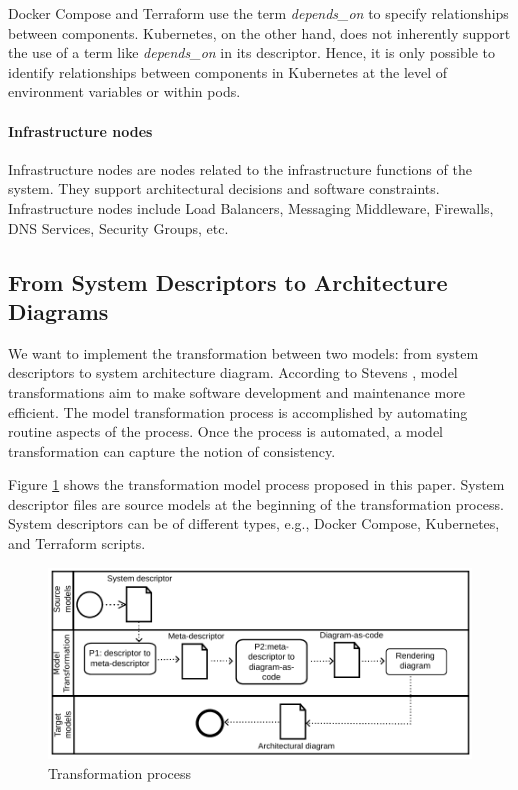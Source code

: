 \documentclass[sigconf]{acmart}
\begin{document}
Docker Compose and Terraform use the term \textit{depends\_on} to specify relationships between components. 
Kubernetes, on the other hand, does not inherently support the use of a term like \textit{depends\_on} in its descriptor. Hence, it is only possible to identify relationships between components in Kubernetes at the level of environment variables or within pods.

\paragraph{\textbf{Infrastructure nodes}} Infrastructure nodes are nodes related to the infrastructure functions of the system. They support architectural decisions and software constraints. Infrastructure nodes include Load Balancers, Messaging Middleware, Firewalls, DNS Services, Security Groups, etc.

\subsection{From System Descriptors to Architecture Diagrams}
\label{sec:meta-descriptor}

We want to implement the transformation between two models: from system descriptors to system architecture diagram. According to Stevens \cite{stevens2008}, model transformations aim to make software development and maintenance more efficient. The model transformation process is accomplished by automating routine aspects of the process. Once the process is automated, a model transformation can capture the notion of consistency.

Figure \ref{fig:model-transformation} shows the transformation model process proposed in this paper. System descriptor files are source models at the beginning of the transformation process. System descriptors can be of different types, e.g., Docker Compose, Kubernetes,  and Terraform scripts.

\begin{figure}[h]
    \centering
    \includegraphics[width=0.99\columnwidth]{figures/model-transformation-bpmn-v2.pdf}
    \caption{Transformation process}
    \label{fig:model-transformation}
\end{figure}
\end{document}
